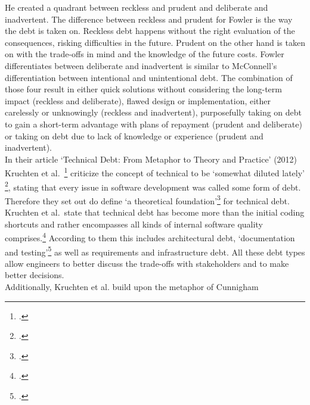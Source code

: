 He created a quadrant between reckless and prudent and deliberate and inadvertent. The difference between reckless and prudent for Fowler is the way the debt is taken on. Reckless debt happens without the right evaluation of the consequences, risking difficulties in the future. Prudent on the other hand is taken on
with the trade-offs in mind and the knowledge of the future costs. Fowler differentiates between deliberate and inadvertent is similar to McConnell's differentiation between intentional and unintentional debt.
The combination of those four result in either quick solutions without considering the long-term impact (reckless and deliberate), flawed design or implementation, either carelessly or unknowingly (reckless and inadvertent), 
purposefully taking on debt to gain a short-term advantage with plans of repayment (prudent and deliberate) or taking on debt due to lack of knowledge or experience (prudent and inadvertent).\\

In their article `Technical Debt: From Metaphor to Theory and Practice' (2012) Kruchten et al.\ \footcite{kruchtenTechnicalDebtMetaphor2012} criticize the concept of technical to be `somewhat diluted lately' \footcite[18]{kruchtenTechnicalDebtMetaphor2012}, stating that every issue in software development was called some form of debt. 
Therefore they set out do define `a theoretical foundation'\footcite[19]{kruchtenTechnicalDebtMetaphor2012} for technical debt.\\
Kruchten et al.\ state that technical debt has become more than the initial coding shortcuts and rather encompasses all kinds of internal software quality comprises.\footcite[19]{kruchtenTechnicalDebtMetaphor2012}
According to them this includes architectural debt, `documentation and testing'\footcite[20]{kruchtenTechnicalDebtMetaphor2012} as well as requirements and infrastructure debt.
All these debt types allow engineers to better discuss the trade-offs with stakeholders and to make better decisions.\\
Additionally, Kruchten et al. build upon the metaphor of Cunnigham 
